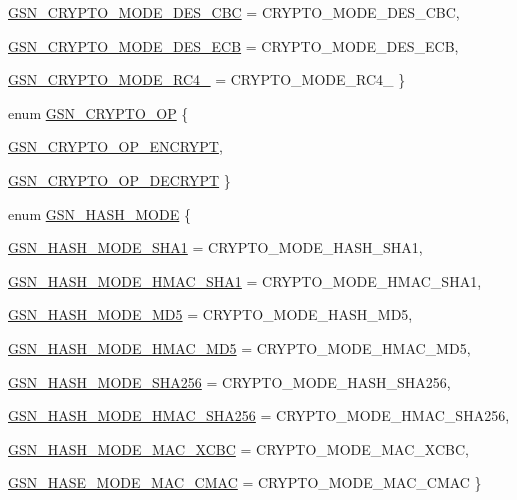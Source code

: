 \begin{DoxyCompactItemize}
\hyperlink{a00515_a3010ebd2596d115219b29d0a14c1f3f6a77d35039842ced178b7bdbfd2e0107e0}{GSN\_\-CRYPTO\_\-MODE\_\-DES\_\-CBC} =  CRYPTO\_\-MODE\_\-DES\_\-CBC, 
\par
\hyperlink{a00515_a3010ebd2596d115219b29d0a14c1f3f6a11ae2a27f4db712aced5f4afd0579bf3}{GSN\_\-CRYPTO\_\-MODE\_\-DES\_\-ECB} =  CRYPTO\_\-MODE\_\-DES\_\-ECB, 
\par
\hyperlink{a00515_a3010ebd2596d115219b29d0a14c1f3f6a8344fda34ccbd513fff9e432bee546c4}{GSN\_\-CRYPTO\_\-MODE\_\-RC4\_} =  CRYPTO\_\-MODE\_\-RC4\_
 \}
\item 
enum \hyperlink{a00515_ab25cef7ae4e4b592cba2ee9ee33d2979}{GSN\_\-CRYPTO\_\-OP} \{ \par
\hyperlink{a00515_ab25cef7ae4e4b592cba2ee9ee33d2979a065ab93fddceb23cd177bde38bcbb7df}{GSN\_\-CRYPTO\_\-OP\_\-ENCRYPT}, 
\par
\hyperlink{a00515_ab25cef7ae4e4b592cba2ee9ee33d2979aa480bc17092102bfb2f5b99ef42a292c}{GSN\_\-CRYPTO\_\-OP\_\-DECRYPT}
 \}
\item 
enum \hyperlink{a00515_a9f050c027d3a6f0f6ea0e5cf4c5b4583}{GSN\_\-HASH\_\-MODE} \{ \par
\hyperlink{a00515_a9f050c027d3a6f0f6ea0e5cf4c5b4583a1fe114b2620507a863bbe6e7a61f622e}{GSN\_\-HASH\_\-MODE\_\-SHA1} =  CRYPTO\_\-MODE\_\-HASH\_\-SHA1, 
\par
\hyperlink{a00515_a9f050c027d3a6f0f6ea0e5cf4c5b4583a32aaf6de96662e4fcb3d99f354cac82e}{GSN\_\-HASH\_\-MODE\_\-HMAC\_\-SHA1} =  CRYPTO\_\-MODE\_\-HMAC\_\-SHA1, 
\par
\hyperlink{a00515_a9f050c027d3a6f0f6ea0e5cf4c5b4583ab6b59dffc007f95a722710fa7c8499b7}{GSN\_\-HASH\_\-MODE\_\-MD5} =  CRYPTO\_\-MODE\_\-HASH\_\-MD5, 
\par
\hyperlink{a00515_a9f050c027d3a6f0f6ea0e5cf4c5b4583aeb1b747aa268916d0ae5893ee4d01387}{GSN\_\-HASH\_\-MODE\_\-HMAC\_\-MD5} =  CRYPTO\_\-MODE\_\-HMAC\_\-MD5, 
\par
\hyperlink{a00515_a9f050c027d3a6f0f6ea0e5cf4c5b4583a7f1eeb9878c24046e45c487c876c6ed1}{GSN\_\-HASH\_\-MODE\_\-SHA256} =  CRYPTO\_\-MODE\_\-HASH\_\-SHA256, 
\par
\hyperlink{a00515_a9f050c027d3a6f0f6ea0e5cf4c5b4583a0828d0200d6113ba7db3b9c7693f5657}{GSN\_\-HASH\_\-MODE\_\-HMAC\_\-SHA256} =  CRYPTO\_\-MODE\_\-HMAC\_\-SHA256, 
\par
\hyperlink{a00515_a9f050c027d3a6f0f6ea0e5cf4c5b4583a45ec081160b3950e6035e43b486b7c5e}{GSN\_\-HASH\_\-MODE\_\-MAC\_\-XCBC} =  CRYPTO\_\-MODE\_\-MAC\_\-XCBC, 
\par
\hyperlink{a00515_a9f050c027d3a6f0f6ea0e5cf4c5b4583a97c4a7807ca086f1b83bd03fd25358f6}{GSN\_\-HASE\_\-MODE\_\-MAC\_\-CMAC} =  CRYPTO\_\-MODE\_\-MAC\_\-CMAC
 \}
\end{DoxyCompactItemize}
